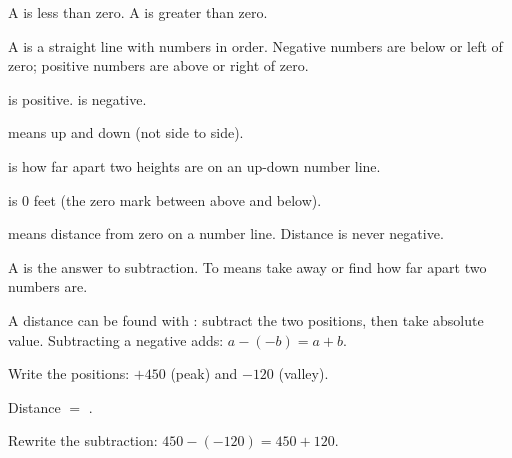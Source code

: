 \begin{words}
  \item A is less than zero. A is greater than zero.
  \item A is a straight line with numbers in order. Negative numbers are below or left of zero; positive numbers are above or right of zero.
  \item {}is positive. is negative.
  \item {}means up and down (not side to side).
  \item {}is how far apart two heights are on an up-down number line.
  \item {}is 0 feet (the zero mark between above and below).
  \item {}means distance from zero on a number line. Distance is never negative.
  \item A is the answer to subtraction. To means take away or find how far apart two numbers are.
  \item A distance can be found with : subtract the two positions, then take absolute value. Subtracting a negative adds: $a - (-b) = a + b$.
\end{words}

\begin{steps}
  \item Write the positions: $+450$ (peak) and $-120$ (valley).
  \item Distance $=$ .
  \item Rewrite the subtraction: $450 - (-120) = 450 + 120$.
\end{steps}

